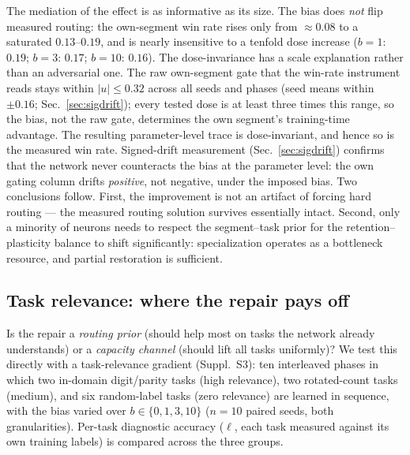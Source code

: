\documentclass[review,12pt,number]{elsarticle}
\begin{document}
The mediation of the effect is as informative as its size. The bias does
\emph{not} flip measured routing: the own-segment win rate rises only from
$\approx 0.08$ to a saturated $0.13$--$0.19$, and is nearly insensitive
to a tenfold dose increase ($b{=}1$: $0.19$; $b{=}3$: $0.17$; $b{=}10$:
$0.16$). The dose-invariance has a scale explanation rather than an
adversarial one. The raw own-segment gate that the win-rate instrument
reads stays within $|u| \le 0.32$ across all seeds and phases (seed
means within $\pm 0.16$; Sec.~\ref{sec:sigdrift}); every tested dose is
at least three times this range, so the bias, not the raw gate,
determines the own segment's training-time advantage. The resulting
parameter-level trace is dose-invariant, and hence so is the measured
win rate. Signed-drift measurement
(Sec.~\ref{sec:sigdrift}) confirms that the network never counteracts
the bias at the parameter level: the own gating column drifts
\emph{positive}, not negative, under the imposed bias. Two conclusions
follow. First, the improvement is not an artifact of forcing hard
routing --- the measured routing solution survives essentially intact.
Second, only a minority of neurons needs to respect the segment--task
prior for the retention--plasticity balance to shift significantly:
specialization operates as a bottleneck resource, and partial
restoration is sufficient.

\subsection{Task relevance: where the repair pays off}
\label{sec:taskrel}

Is the repair a \emph{routing prior} (should help most on tasks the
network already understands) or a \emph{capacity channel} (should lift
all tasks uniformly)? We test this directly with a task-relevance
gradient (Suppl.~S3): ten interleaved phases in which two in-domain
digit/parity tasks (high relevance), two rotated-count tasks (medium),
and six random-label tasks (zero relevance) are learned in sequence,
with the bias varied over $b \in \{0,1,3,10\}$
($n{=}10$ paired seeds, both granularities). Per-task diagnostic
accuracy ($\ell$, each task measured against its own training labels)
is compared across the three groups.
\end{document}
